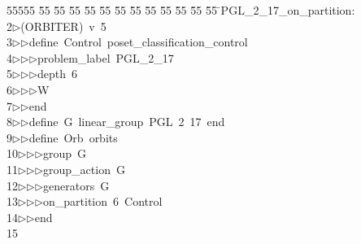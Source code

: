 %
%
\begin{tabbing}
55555 \= 55 \= 55 \= 55 \= 55 \= 55 \= 55 \= 55 \= 55 \= 55 \= 55 \= 55 \= 55 \= \>PGL\_2\_17\_on\_partition:\\[0pt]
2\>$\triangleright$\>(ORBITER)\ v\ 5\ \\[0pt]
3\>$\triangleright$\>$\triangleright$\>define\ Control\ poset\_classification\_control\ \\[0pt]
4\>$\triangleright$\>$\triangleright$\>$\triangleright$\>problem\_label\ PGL\_2\_17\ \\[0pt]
5\>$\triangleright$\>$\triangleright$\>$\triangleright$\>depth\ 6\ \\[0pt]
6\>$\triangleright$\>$\triangleright$\>$\triangleright$\>W\ \\[0pt]
7\>$\triangleright$\>$\triangleright$\>end\ \\[0pt]
8\>$\triangleright$\>$\triangleright$\>define\ G\ linear\_group\ PGL\ 2\ 17\ end\ \\[0pt]
9\>$\triangleright$\>$\triangleright$\>define\ Orb\ orbits\ \\[0pt]
10\>$\triangleright$\>$\triangleright$\>$\triangleright$\>group\ G\ \\[0pt]
11\>$\triangleright$\>$\triangleright$\>$\triangleright$\>group\_action\ G\ \\[0pt]
12\>$\triangleright$\>$\triangleright$\>$\triangleright$\>generators\ G\ \\[0pt]
13\>$\triangleright$\>$\triangleright$\>$\triangleright$\>on\_partition\ 6\ Control\ \\[0pt]
14\>$\triangleright$\>$\triangleright$\>end\\[0pt]
15\>\end{tabbing}
